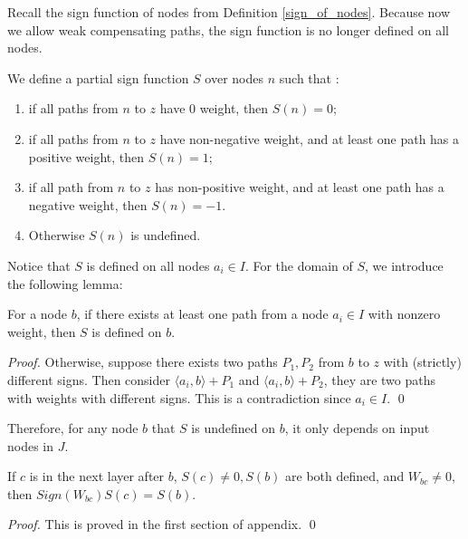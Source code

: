 			
			
			Recall the sign function of nodes from Definition \ref{sign_of_nodes}. Because now we allow weak compensating paths, the sign function is no longer defined on all nodes.
			
			
			
			
			\begin{definition}\label{sign_of_nodes_in_I_2}
				We define a partial sign function $S$ over nodes $n$ such that : 	
				\begin{enumerate} 
					\item if all paths from $n$ to $z$ have 0 weight, then $S(n)=0$; 
					\item if all paths from $n$ to $z$ have non-negative weight, and at least one path has a positive weight, then $S(n)=1$; 
					\item if all path from $n$ to $z$ has non-positive weight, and at least one path has a negative weight, then $S(n)=-1$.
					\item Otherwise $S(n)$ is undefined.
				\end{enumerate}
			\end{definition}	
			
			Notice that $S$ is defined on all nodes $a_i \in I$. For the domain of $S$, we introduce the following lemma:
			
			\begin{lemma}\label{lem:sign}
				For a node $b$, if there exists at least one path from a node $a_i\in I$ with nonzero weight, then  $S$ is defined on $b$.
			\end{lemma}
			
			\begin{proof}
				Otherwise, suppose there exists two paths $P_1,P_2$ from $b$ to $z$ with (strictly) different signs. Then consider $\langle a_i,b\rangle+P_1$ and $\langle a_i,b\rangle+P_2$, they are two paths with weights with different signs. This is a contradiction since $a_i\in I$. \qed
			\end{proof}
			Therefore, for any node $b$  that $S$ is undefined on $b$, it only depends on input nodes in $J$.  
			
			\begin{lemma}
				If $c$ is in the next layer after $b$, $S(c)\neq 0, S(b)$ are both defined, and $W_{bc}\neq 0$, then $Sign(W_{bc})S(c)=S(b)$.
			\end{lemma}
			
			\begin{proof}
				This is proved in the first section of appendix. \qed
			\end{proof}
			
